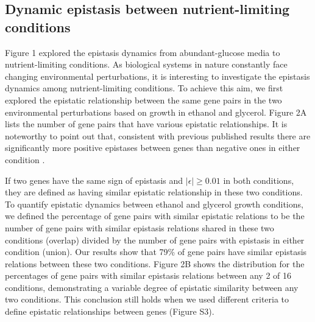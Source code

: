 \subsection{Dynamic epistasis between nutrient-limiting conditions}

Figure 1 explored the epistasis dynamics from abundant-glucose media
to nutrient-limiting conditions. As biological systems in nature
constantly face changing environmental perturbations, it is
interesting to investigate the epistasis dynamics among
nutrient-limiting conditions. To achieve this aim, we first explored
the epistatic relationship between the same gene pairs in the two
environmental perturbations based on growth in ethanol and
glycerol. Figure 2A lists the number of gene pairs that have various
epistatic relationships. It is noteworthy to point out that,
consistent with previous published results there are significantly
more positive epistases between genes than negative ones in either
condition \citep{He2010}.

If two genes have the same sign of epistasis and
$\left|\epsilon\right| \geq 0.01$ in both conditions, they are defined
as having similar epistatic
relationship in these two conditions. To quantify epistatic dynamics
between ethanol and glycerol growth conditions, we defined the
percentage of gene pairs with similar epistatic relations to be the
number of gene pairs with similar epistasis relations shared in these
two conditions (overlap) divided by the number of gene pairs with
epistasis in either condition (union). Our results show that 79\% of
gene pairs have similar epistasis relations between these two
conditions. Figure 2B shows the distribution for the percentages of
gene pairs with similar epistasis relations between any 2 of 16
conditions, demonstrating a variable degree of epistatic similarity
between any two conditions.  This conclusion still holds when we used
different criteria to define epistatic relationships between genes
(Figure S3).

